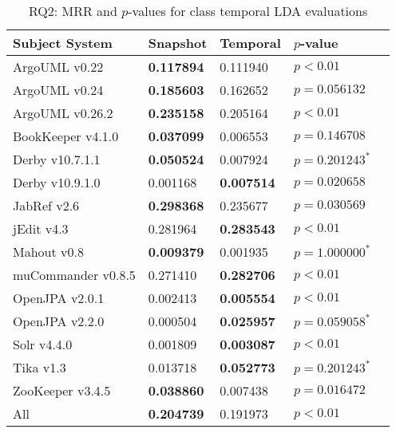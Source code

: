 
\begin{table}[t]
\renewcommand{\arraystretch}{1.3}
\footnotesize
\centering
\caption{RQ2: MRR and $p$-values for class temporal LDA evaluations}
\begin{tabular}{l|ll|ll}
   \toprule
    Subject System & Snapshot & Temporal & $p$-value  \\
    \midrule

ArgoUML v0.22 & {\bf 0.117894 } & 0.111940 & $p < 0.01$ \\
ArgoUML v0.24 & {\bf 0.185603 } & 0.162652 & $p = 0.056132$ \\
ArgoUML v0.26.2 & {\bf 0.235158 } & 0.205164 & $p < 0.01$ \\
BookKeeper v4.1.0 & {\bf 0.037099 } & 0.006553 & $p = 0.146708$ \\
Derby v10.7.1.1 & {\bf 0.050524 } & 0.007924 & $p = 0.201243^{*}$ \\
Derby v10.9.1.0 & 0.001168 & {\bf 0.007514 } & $p = 0.020658$ \\
JabRef v2.6 & {\bf 0.298368 } & 0.235677 & $p = 0.030569$ \\
jEdit v4.3 & 0.281964 & {\bf 0.283543 } & $p < 0.01$ \\
Mahout v0.8 & {\bf 0.009379 } & 0.001935 & $p = 1.000000^{*}$ \\
muCommander v0.8.5 & 0.271410 & {\bf 0.282706 } & $p < 0.01$ \\
OpenJPA v2.0.1 & 0.002413 & {\bf 0.005554 } & $p < 0.01$ \\
OpenJPA v2.2.0 & 0.000504 & {\bf 0.025957 } & $p = 0.059058^{*}$ \\
Solr v4.4.0 & 0.001809 & {\bf 0.003087 } & $p < 0.01$ \\
Tika v1.3 & 0.013718 & {\bf 0.052773 } & $p = 0.201243^{*}$ \\
ZooKeeper v3.4.5 & {\bf 0.038860 } & 0.007438 & $p = 0.016472$ \\
\midrule
All & {\bf 0.204739 } & 0.191973 & $p < 0.01$ \\

    \bottomrule
\end{tabular}
\label{table:rq2:class:lda}
\end{table}

